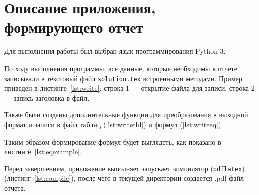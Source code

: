 \section{Описание приложения, формирующего отчет}

Для выполнения работы был выбран язык программирования Python 3.

По ходу выполнения программы, все данные, которые необходимы в отчете записывали в текстовый файл \texttt{solution.tex} встроенными методами. Пример приведен в листинге~\ref{lst:write}: строка 1 --- открытие файла для записи, строка 2 --- запись заголовка в файл.


Также были созданы дополнительные функции для преобразования в выходной формат и записи в файл таблиц (\ref{lst:writetbl}) и формул (\ref{lst:writeeq})


Таким образом формирование формул будет выглядеть, как показано в листинге~\ref{lst:eqexample}.


Перед завершением, приложение выполняет запускает компилятор (\texttt{pdflatex}) (листинг~\ref{lst:compile}), после чего в текущей директории создается .pdf-файл отчета.

